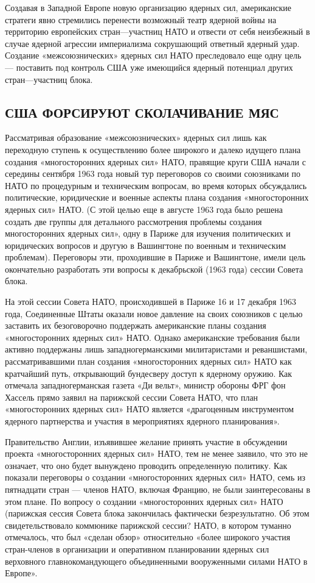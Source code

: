 \documentclass[12pt, a4paper, openany]{book}
\begin{document}
	Создавая в Западной Европе новую организацию ядерных сил, американские стратеги явно стремились перенести возможный театр ядерной войны на территорию европейских стран—участниц НАТО и отвести от себя неизбежный в случае ядерной агрессии империализма сокрушающий ответный ядерный удар. Создание «межсоюзнических» ядерных сил НАТО преследовало еще одну цель — поставить под контроль США уже имеющийся ядерный потенциал других стран—участниц блока.
	

	\subsection[США форсируют сколачивание МЯС]{\center США ФОРСИРУЮТ СКОЛАЧИВАНИЕ МЯС}	
	
	Рассматривая образование «межсоюзнических» ядерных сил лишь как переходную ступень к осуществлению более широкого и далеко идущего плана создания «многосторонних ядерных сил» НАТО, правящие круги США начали с середины сентября 1963 года новый тур переговоров со своими союзниками по НАТО по процедурным и техническим вопросам, во время которых обсуждались политические, юридические и военные аспекты плана создания «многосторонних ядерных сил» НАТО. (С этой целью еще в августе 1963 года было решена создать две группы для детального рассмотрения проблемы создания многосторонних ядерных сил», одну в Париже для изучения политических и юридических вопросов и другую в Вашингтоне по военным и техническим проблемам). Переговоры эти, проходившие в Париже и Вашингтоне, имели цель окончательно разработать эти вопросы к декабрьской (1963 года) сессии Совета блока.
	
	На этой сессии Совета НАТО, происходившей в Париже 16 и 17 декабря 1963 года, Соединенные Штаты оказали новое давление на своих союзников с целью заставить их безоговорочно поддержать американские планы создания «многосторонних ядерных сил» НАТО. Однако американские требования были активно поддержаны лишь западногерманскими милитаристами и реваншистами, рассматривавшими план создания «многосторонних ядерных сил» НАТО как кратчайший путь, открывающий бундесверу доступ к ядерному оружию. Как отмечала западногерманская газета «Ди вельт», министр обороны ФРГ фон Хассель прямо заявил на парижской сессии Совета НАТО, что план «многосторонних ядерных сил» НАТО является «драгоценным инструментом ядерного партнерства и участия в мероприятиях ядерного планирования».
	
	Правительство Англии, изъявившее желание принять участие в обсуждении проекта «многосторонних ядерных сил» НАТО, тем не менее заявило, что это не означает, что оно будет вынуждено проводить определенную политику. Как показали переговоры о создании «многосторонних ядерных сил» НАТО, семь из пятнадцати стран — членов НАТО, включая Францию, не были заинтересованы в этом плане. По вопросу о создании «многосторонних ядерных сил» НАТО (парижская сессия Совета блока закончилась фактически безрезультатно. Об этом свидетельствовало коммюнике парижской сессии? НАТО, в котором туманно отмечалось, что был «сделан обзор» относительно «более широкого участия стран-членов в организации и оперативном планировании ядерных сил верховного главнокомандующего объединенными вооруженными силами НАТО в Европе».
	
\end{document}
